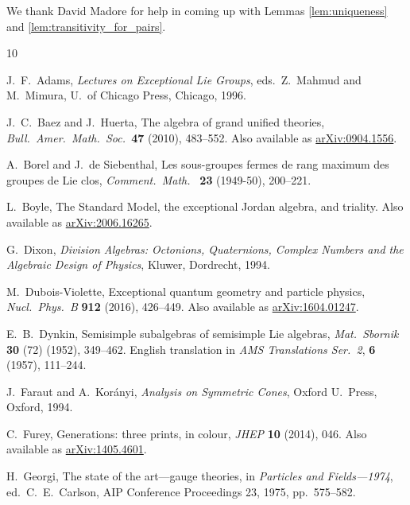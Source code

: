 \documentclass{article}
\theoremstyle{plain}
\theoremstyle{remark}
\theoremstyle{definition}
\begin{document}
We thank David Madore for help in coming up with Lemmas \ref{lem:uniqueness} and \ref{lem:transitivity_for_pairs}.

\begin{thebibliography}{10}

 J.\ F.\ Adams, \textsl{Lectures on Exceptional Lie Groups}, eds.\ Z.\ Mahmud and M.\ Mimura, U.\ of Chicago Press, Chicago, 1996.

 J.\ C.\ Baez and J.\ Huerta,  The algebra of grand unified theories, \textsl{Bull.\ Amer.\ Math.\ Soc.\ }\textbf{47} (2010), 483--552.  Also available as \href{https://arxiv.org/abs/0904.1556}{arXiv:0904.1556}.

 A.\ Borel and J.\ de Siebenthal, Les sous-groupes fermes de rang maximum des groupes de Lie clos, \textsl{Comment.\ Math.\ } \textbf{23} (1949-50), 200--221.

 L.\ Boyle, The Standard Model, the exceptional Jordan algebra, and triality. Also available as \href{https://arxiv.org/abs/2006.16265}{arXiv:2006.16265}.


 G.\ Dixon, \textsl{Division Algebras: Octonions, Quaternions, Complex Numbers and the Algebraic Design of Physics}, Kluwer, Dordrecht, 1994.

 M.\ Dubois-Violette, Exceptional quantum geometry and particle physics, \textsl{Nucl.\ Phys.\ B} \textbf{912} (2016), 426--449. Also available as \href{https://arxiv.org/abs/1604.01247}{arXiv:1604.01247}.

 E.\ B.\ Dynkin, Semisimple subalgebras of semisimple Lie algebras, \textsl{Mat.\ Sbornik} \textbf{30} (72) (1952), 349--462. English translation in \textsl{AMS Translations Ser.\ 2}, \textbf{6} (1957), 111--244. 

 J.~Faraut and A.~Kor\'anyi, \textsl{Analysis on Symmetric Cones}, Oxford U.\ Press, Oxford, 1994.

 C.\ Furey, Generations: three prints, in colour, \textsl{JHEP} \textbf{10} (2014), 046. Also available as \href{http://arXiv.org/abs/1405.4601}{arXiv:1405.4601}.

 H.\ Georgi, The state of the art---gauge theories, in \textsl{Particles and Fields---1974}, ed.\ C.\ E.\ Carlson, AIP Conference Proceedings 23, 1975, pp.\ 575–582.


\end{thebibliography}
\end{document}
